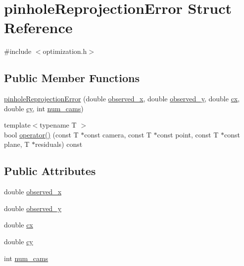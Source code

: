 \hypertarget{structpinholeReprojectionError}{\section{pinhole\-Reprojection\-Error Struct Reference}
\label{d7/d5b/structpinholeReprojectionError}
}


{\ttfamily \#include $<$optimization.\-h$>$}

\subsection*{Public Member Functions}
\begin{DoxyCompactItemize}
\item 
\hyperlink{structpinholeReprojectionError_a2b39d76ebedd7164b5d37899f695d33b}{pinhole\-Reprojection\-Error} (double \hyperlink{structpinholeReprojectionError_adc28355ad6705458a73690c6c904d478}{observed\-\_\-x}, double \hyperlink{structpinholeReprojectionError_ab1876f1f22f1648d1621dfc53046a329}{observed\-\_\-y}, double \hyperlink{structpinholeReprojectionError_a2f550c74a75d53ba0d1b2fc3a9c3d4c1}{cx}, double \hyperlink{structpinholeReprojectionError_af979ca78cb6350ffe5da1783c1344a09}{cy}, int \hyperlink{structpinholeReprojectionError_aaa8f2e269d0825892f73ed4691194fba}{num\-\_\-cams})
\item 
{\footnotesize template$<$typename T $>$ }\\bool \hyperlink{structpinholeReprojectionError_a31a0aae8c92365c7dc02bc95bb022005}{operator()} (const T $\ast$const camera, const T $\ast$const point, const T $\ast$const plane, T $\ast$residuals) const 
\end{DoxyCompactItemize}
\subsection*{Public Attributes}
\begin{DoxyCompactItemize}
\item 
double \hyperlink{structpinholeReprojectionError_adc28355ad6705458a73690c6c904d478}{observed\-\_\-x}
\item 
double \hyperlink{structpinholeReprojectionError_ab1876f1f22f1648d1621dfc53046a329}{observed\-\_\-y}
\item 
double \hyperlink{structpinholeReprojectionError_a2f550c74a75d53ba0d1b2fc3a9c3d4c1}{cx}
\item 
double \hyperlink{structpinholeReprojectionError_af979ca78cb6350ffe5da1783c1344a09}{cy}
\item 
int \hyperlink{structpinholeReprojectionError_aaa8f2e269d0825892f73ed4691194fba}{num\-\_\-cams}
\end{DoxyCompactItemize}



